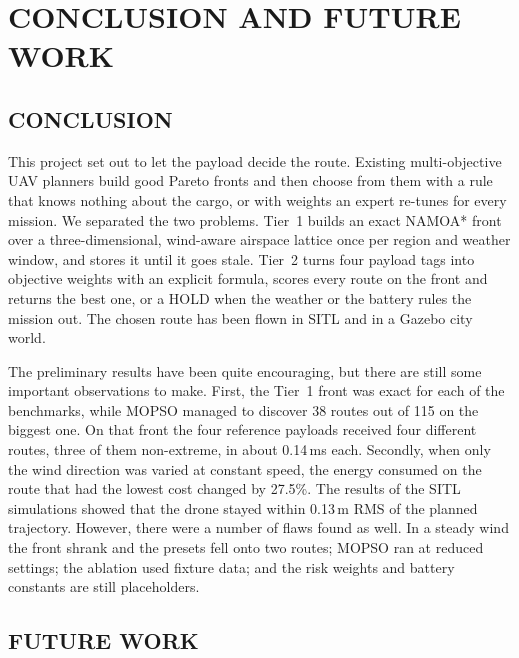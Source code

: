 
\chapter{CONCLUSION AND FUTURE WORK}\label{cha:conclusion}

\section{CONCLUSION}

This project set out to let the payload decide the route. Existing multi-objective UAV
planners build good Pareto fronts and then choose from them with a rule that knows
nothing about the cargo, or with weights an expert re-tunes for every mission. We
separated the two problems. Tier~1 builds an exact NAMOA* front over a
three-dimensional, wind-aware airspace lattice once per region and weather window, and
stores it until it goes stale. Tier~2 turns four payload
tags into objective weights with an explicit formula, scores every route on the front
and returns the best one, or a HOLD when the weather or the battery rules the mission
out. The chosen route has been flown in SITL and in a Gazebo city world.

The preliminary results have been quite encouraging, but there are still some important
observations to make. First, the Tier~1 front was exact for each of the benchmarks, while MOPSO managed to discover 38 routes
out of 115 on the biggest one. On that front the four reference payloads received four
different routes, three of them non-extreme, in about 0.14\,ms each. Secondly, when only the wind direction was varied at constant speed,
the energy consumed on the route that had the lowest cost changed by 27.5\%. The results
of the SITL simulations showed that the drone stayed within 0.13\,m RMS of the planned
trajectory. However, there were a number of flaws found as well. In a steady wind the front
shrank and the presets fell onto two routes; MOPSO ran at reduced settings; the ablation
used fixture data; and the risk weights and battery constants are still placeholders.

\section{FUTURE WORK}

